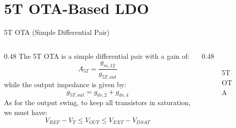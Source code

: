 \documentclass[10pt, aspectratio=169]{beamer}
\newcommand{\svg}[3]{
    \begin{figure}
        \centering
        
        \caption{#2}
    \end{figure}
}
\begin{document}
\section{5T OTA-Based LDO}
\begin{frame}{5T OTA (Simple Differential Pair)}
    \begin{columns}[c,onlytextwidth]
        \begin{column}{0.48\textwidth}
            The 5T OTA is a simple differential pair with a gain of:
            \begin{equation*}
                A_{5T}=\frac{g_{m,12}}{g_{5T,out}}
            \end{equation*}
            while the output impedance is given by:
            \begin{equation*}
                g_{5T,out}=g_{ds,2}+g_{ds,4}
            \end{equation*}
            As for the output swing, to keep all transistors in saturation, we must have:
            \begin{equation*}
                V_{REF} - V_{T} \leq V_{OUT} \leq V_{EXT} - V_{DSAT}
            \end{equation*}
        \end{column}
        \begin{column}{0.48\textwidth}
            \svg{../images/5t_ota.svg}{5T OTA}{1}
        \end{column}
    \end{columns}
\end{frame}
\end{document}
